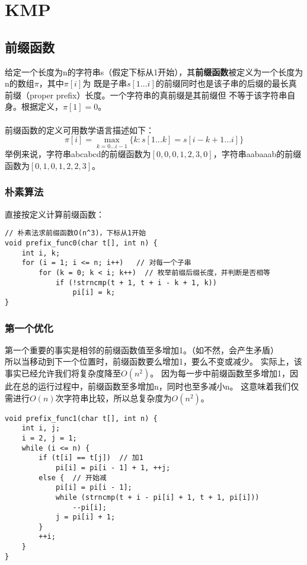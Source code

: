 \section{KMP}
    \subsection{前缀函数}
        给定一个长度为n的字符串s（假定下标从1开始），其\textbf{前缀函数}被定义为一个长度为n的数组$\pi$，其中$\pi[i]$为
        既是子串$s[1\dots i]$的前缀同时也是该子串的后缀的最长真前缀（proper prefix）长度。一个字符串的真前缀是其前缀但
        不等于该字符串自身。根据定义，$\pi[1]=0$。\\\\
        前缀函数的定义可用数学语言描述如下：
        $$\pi[i]=\max _{k=0 \ldots i-1}\{k : s[1 \ldots k]=s[i-k+1 \ldots i]\}$$
        举例来说，字符串abcabcd的前缀函数为$[0,0,0,1,2,3,0]$，字符串aabaaab的前缀函数为$[0,1,0,1,2,2,3]$。
        \subsubsection{朴素算法}
            直接按定义计算前缀函数：
            \begin{lstlisting}
// 朴素法求前缀函数O(n^3)，下标从1开始
void prefix_func0(char t[], int n) {
    int i, k;
    for (i = 1; i <= n; i++)   // 对每一个子串
        for (k = 0; k < i; k++)  // 枚举前缀后缀长度，并判断是否相等
            if (!strncmp(t + 1, t + i - k + 1, k))
                pi[i] = k;
}
            \end{lstlisting}
        \subsubsection{第一个优化}
            第一个重要的事实是相邻的前缀函数值至多增加1。（如不然，会产生矛盾）\\
            所以当移动到下一个位置时，前缀函数要么增加1，要么不变或减少。
            实际上，该事实已经允许我们将复杂度降至$O(n^2)$。
            因为每一步中前缀函数至多增加1，因此在总的运行过程中，前缀函数至多增加n，同时也至多减小n。
            这意味着我们仅需进行$O(n)$次字符串比较，所以总复杂度为$O(n^2)$。
            \begin{lstlisting}
void prefix_func1(char t[], int n) {
    int i, j;
    i = 2, j = 1;
    while (i <= n) {
        if (t[i] == t[j])  // 加1
            pi[i] = pi[i - 1] + 1, ++j;
        else {  // 开始减
            pi[i] = pi[i - 1];
            while (strncmp(t + i - pi[i] + 1, t + 1, pi[i]))
                --pi[i];
            j = pi[i] + 1;
        }
        ++i;
    }
}
            \end{lstlisting}
